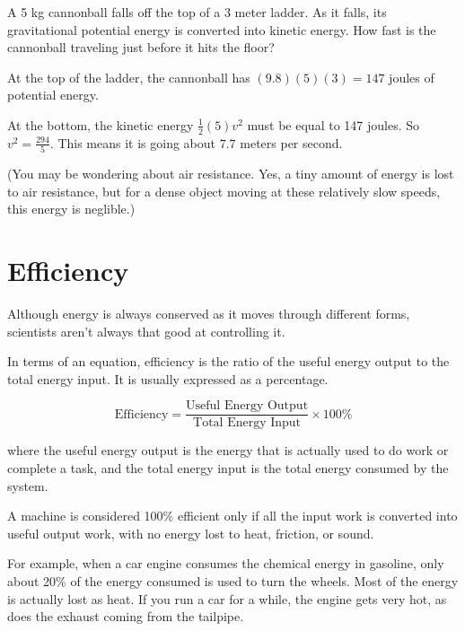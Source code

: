 \begin{Exercise}[title={The Energy of Falling}, label=energy_falling]

A 5 kg cannonball falls off the top of a 3 meter ladder. As it falls,
its gravitational potential energy is converted into kinetic energy.
How fast is the cannonball traveling just before
it hits the floor?

\end{Exercise}
\begin{Answer}[ref=energy_falling]

  At the top of the ladder, the cannonball has $(9.8)(5)(3) = 147$ joules of potential energy.

  At the bottom, the kinetic energy $\frac{1}{2}(5)v^2$ must be equal
  to 147 joules. So $v^2 = \frac{294}{5}$.  This means it is going about
  $7.7$ meters per second.

  (You may be wondering about air resistance. Yes, a tiny amount of energy is lost to air resistance, but for a dense
  object moving at these relatively slow speeds, this energy is
  neglible.)

\end{Answer}


\section{Efficiency}


Although energy is always conserved as it moves through different
forms, scientists aren't always that good at controlling it.

In terms of an equation, efficiency is the ratio of the useful energy
output to the total energy input. It is usually expressed as a
percentage.
\begin{mdframed}[style=important, frametitle={Formula for Efficiency}]
\[
\text{Efficiency} = \frac{\text{Useful Energy Output}}{\text{Total Energy Input}} \times 100\%
\]
\end{mdframed}
where the useful energy output is the energy that is actually used to do work or complete a task, and the total energy input is the total energy consumed by the system.

A machine is considered 100\% efficient only if all the input work is converted into useful output work, with no energy lost to heat, friction, or sound.

For example, when a car engine consumes the chemical energy in gasoline, only
about 20\% of the energy consumed is used to turn the wheels. Most of
the energy is actually lost as heat. If you run a car for a while, the engine
gets very hot, as does the exhaust coming from the tailpipe.

